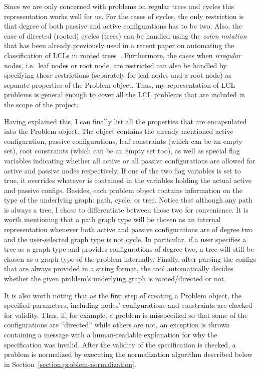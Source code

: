 Since we are only concerned with problems on regular trees and cycles
this representation works well for us. For the cases of cycles,
the only restriction is that degree of both passive and
active configurations has to be two. Also, the case
of directed (rooted) cycles (trees) can be handled
using the \emph{colon notation} that has been already
previously used in a recent paper on automating
the classification of LCLs in rooted trees~\cite{Balliu2021}.
Furthermore, the cases when \emph{irregular} nodes, i.e.\ leaf
nodes or root node, are restricted can also
be handled by specifying those restrictions
(separately for leaf nodes and a root node)
as separate properties of the Problem object.
Thus, my representation of LCL problems is general
enough to cover all the LCL problems that are
included in the scope of the project.

Having explained this, I can finally list all the
properties that are encapsulated into the
Problem object. The object contains the already
mentioned active configuration, passive configurations,
leaf constraints (which can be an empty set), root constraints
(which can be an empty set too), as well as special flag variables
indicating whether all active or all passive configurations
are allowed for active and passive nodes respectively.
If one of the two flag variables is set to true,
it overrides whatever is contained in the variables
holding the actual active and passive configs.
Besides, each problem object contains information
on the type of the underlying graph: path, cycle, or
tree. Notice that although any path is always a tree,
I chose to differentiate between those two
for convenience. It is worth mentioning that
a path graph type will be chosen as an internal
representation whenever both active and
passive configurations are of degree two and
the user-selected graph type is not cycle.
In particular, if a user specifies a tree as a graph
type and provides configurations of degree two,
a tree will still be chosen as a graph type of the problem
internally. Finally, after parsing the configs
that are always provided in a string format,
the tool automatically decides whether the given problem's
underlying graph is rooted/directed or not.

It is also worth noting that as the first step of
creating a Problem object, the specified parameters,
including nodes' configurations and constraints
are checked for validity. Thus, if, for example,
a problem is misspecified so that some of the
configurations are ``directed'' while others are not,
an exception is thrown containing a message with
a human-readable explanation for why the
specification was invalid. After the validity
of the specification is checked, a problem is
normalized by executing the normalization algorithm
described below in Section~\ref{section:problem-normalization}.

